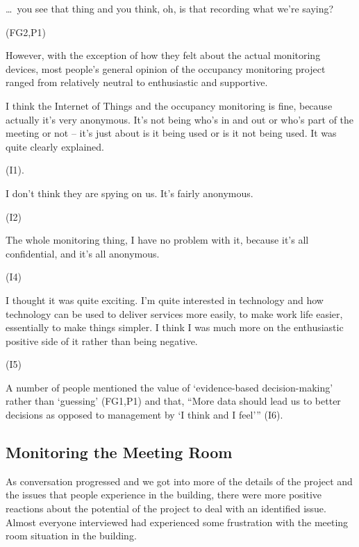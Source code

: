 \begin{qt}\ldots\  you see that thing and you think, oh, is that
recording what we’re saying?\end{qt} (FG2,P1)

However, with the exception of how they felt about the actual
monitoring devices, most people’s general opinion of the occupancy
monitoring project ranged from relatively neutral to enthusiastic and
supportive.

\begin{qt}I think the Internet of Things and the occupancy monitoring is fine,
because actually it’s very anonymous. It’s not being who’s in and out
or who’s part of the meeting or not – it’s just about is it being used
or is it not being used. It was quite clearly explained.\end{qt}
(I1).

\begin{qt}I don’t think they are spying on us. It’s fairly anonymous.\end{qt} (I2)

\begin{qt}The whole monitoring thing, I have no problem with it, because it’s
all confidential, and it’s all anonymous.\end{qt} (I4)

\begin{qt}I thought it was quite exciting. I’m quite interested in technology
and how technology can be used to deliver services more easily, to
make work life easier, essentially to make things simpler. I think I
was much more on the enthusiastic positive side of it rather than
being negative.\end{qt} (I5)

A number of people mentioned the value of ‘evidence-based decision-making’ rather than ‘guessing’ (FG1,P1) and that, “More data should lead us to better decisions as opposed to management by ‘I think and I feel’” (I6).

\subsection{Monitoring the Meeting Room}
As conversation progressed and we got into more of the details of the
project and the issues that people experience in the building, there
were more positive reactions about the potential of the project to
deal with an identified issue. Almost everyone interviewed had
experienced some frustration with the meeting room situation in the
building.


